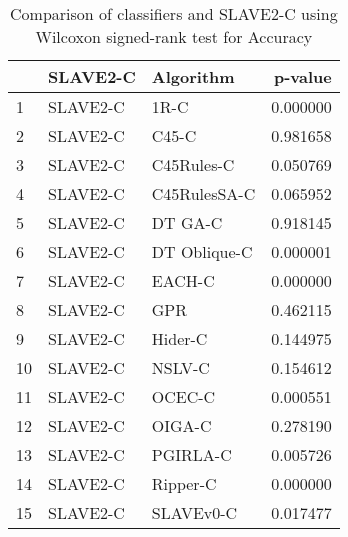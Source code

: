 \begin{table}
\footnotesize
\caption{Comparison of classifiers and SLAVE2-C using Wilcoxon signed-rank test for Accuracy}
\label{tab:SLAVE2-C wilcoxon Accuracy comparison}
\begin{tabular}{lllr}
\hline
 & SLAVE2-C & Algorithm & p-value \\
\hline
1 & SLAVE2-C & 1R-C & 0.000000 \\
2 & SLAVE2-C & C45-C & 0.981658 \\
3 & SLAVE2-C & C45Rules-C & 0.050769 \\
4 & SLAVE2-C & C45RulesSA-C & 0.065952 \\
5 & SLAVE2-C & DT GA-C & 0.918145 \\
6 & SLAVE2-C & DT Oblique-C & 0.000001 \\
7 & SLAVE2-C & EACH-C & 0.000000 \\
8 & SLAVE2-C & GPR & 0.462115 \\
9 & SLAVE2-C & Hider-C & 0.144975 \\
10 & SLAVE2-C & NSLV-C & 0.154612 \\
11 & SLAVE2-C & OCEC-C & 0.000551 \\
12 & SLAVE2-C & OIGA-C & 0.278190 \\
13 & SLAVE2-C & PGIRLA-C & 0.005726 \\
14 & SLAVE2-C & Ripper-C & 0.000000 \\
15 & SLAVE2-C & SLAVEv0-C & 0.017477 \\
\hline
\end{tabular}
\end{table}
